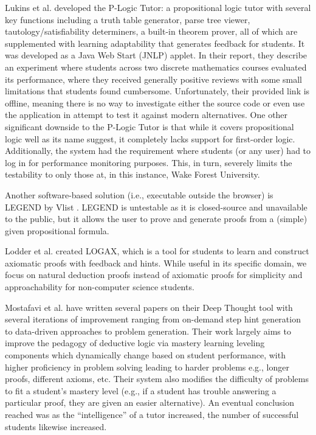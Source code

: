 \documentclass[ms]{uncgdissertationexp2}
\theoremstyle{plain}
\theoremstyle{definition}
\theoremstyle{remark}
\begin{document}
Lukins et al. \cite{lukins} developed the P-Logic Tutor: a propositional logic tutor with several key functions including a truth table generator, parse tree viewer, tautology/satisfiability determiners, a built-in theorem prover, all of which are supplemented with learning adaptability that generates feedback for students. It was developed as a Java Web Start (JNLP) applet. In their report, they describe an experiment where students across two discrete mathematics courses evaluated its performance, where they received generally positive reviews with some small limitations that students found cumbersome. Unfortunately, their provided link is offline, meaning there is no way to investigate either the source code or even use the application in attempt to test it against modern alternatives. One other significant downside to the P-Logic Tutor is that while it covers propositional logic well as its name suggest, it completely lacks support for first-order logic. Additionally, the system had the requirement where students (or any user) had to log in for performance monitoring purposes. This, in turn, severely limits the testability to only those at, in this instance, Wake Forest University. 

Another software-based solution (i.e., executable outside the browser) is LEGEND by Vlist \cite{vlist}. LEGEND is untestable as it is closed-source and unavailable to the public, but it allows the user to prove and generate proofs from a (simple) given propositional formula.

Lodder et al. \cite{lodder} created LOGAX, which is a tool for students to learn and construct axiomatic proofs with feedback and hints. While useful in its specific domain, we focus on natural deduction proofs instead of axiomatic proofs for simplicity and approachability for non-computer science students.

Mostafavi et al. \cite{mostafavi} have written several papers on their Deep Thought tool with several iterations of improvement ranging from on-demand step hint generation to data-driven approaches to problem generation. Their work largely aims to improve the pedagogy of deductive logic via mastery learning leveling components which dynamically change based on student performance, with higher proficiency in problem solving leading to harder problems e.g., longer proofs, different axioms, etc. Their system also modifies the difficulty of problems to fit a student's mastery level (e.g., if a student has trouble answering a particular proof, they are given an easier alternative). An eventual conclusion reached was as the ``intelligence'' of a tutor increased, the number of successful students likewise increased. 
\end{document}
